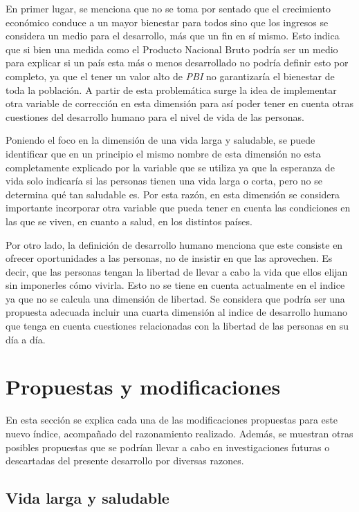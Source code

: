 \documentclass[
  10pt,
]{article}
\begin{document}
En primer lugar, se menciona que no se toma por sentado que el
crecimiento económico conduce a un mayor bienestar para todos sino que
los ingresos se considera un medio para el desarrollo, más que un fin en
sí mismo. Esto indica que si bien una medida como el Producto Nacional
Bruto podría ser un medio para explicar si un país esta más o menos
desarrollado no podría definir esto por completo, ya que el tener un
valor alto de \emph{PBI} no garantizaría el bienestar de toda la
población. A partir de esta problemática surge la idea de implementar
otra variable de corrección en esta dimensión para así poder tener en
cuenta otras cuestiones del desarrollo humano para el nivel de vida de
las personas.

Poniendo el foco en la dimensión de una vida larga y saludable, se puede
identificar que en un principio el mismo nombre de esta dimensión no
esta completamente explicado por la variable que se utiliza ya que la
esperanza de vida solo indicaría si las personas tienen una vida larga o
corta, pero no se determina qué tan saludable es. Por esta razón, en
esta dimensión se considera importante incorporar otra variable que
pueda tener en cuenta las condiciones en las que se viven, en cuanto a
salud, en los distintos países.

Por otro lado, la definición de desarrollo humano menciona que este
consiste en ofrecer oportunidades a las personas, no de insistir en que
las aprovechen. Es decir, que las personas tengan la libertad de llevar
a cabo la vida que ellos elijan sin imponerles cómo vivirla. Esto no se
tiene en cuenta actualmente en el indice ya que no se calcula una
dimensión de libertad. Se considera que podría ser una propuesta
adecuada incluir una cuarta dimensión al indice de desarrollo humano que
tenga en cuenta cuestiones relacionadas con la libertad de las personas
en su día a día.

\hypertarget{propuestas-y-modificaciones}{%
\section{Propuestas y
modificaciones}\label{propuestas-y-modificaciones}}

En esta sección se explica cada una de las modificaciones propuestas
para este nuevo índice, acompañado del razonamiento realizado. Además,
se muestran otras posibles propuestas que se podrían llevar a cabo en
investigaciones futuras o descartadas del presente desarrollo por
diversas razones.

\hypertarget{vida-larga-y-saludable-1}{%
\subsection{Vida larga y saludable}\label{vida-larga-y-saludable-1}}
\end{document}
